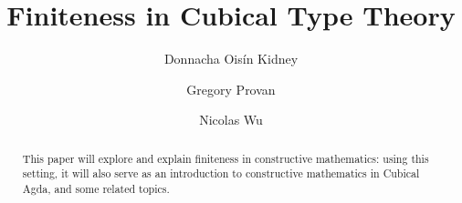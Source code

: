 

\title{Finiteness in Cubical Type Theory}

\author{Donnacha Oisín Kidney}

\author{Gregory Provan}

\author{Nicolas Wu}

\begin{abstract}
  This paper will explore and explain finiteness in constructive mathematics: using this setting, it will also serve as an introduction to constructive mathematics in Cubical Agda, and some related topics.
\end{abstract}

\maketitle











 
